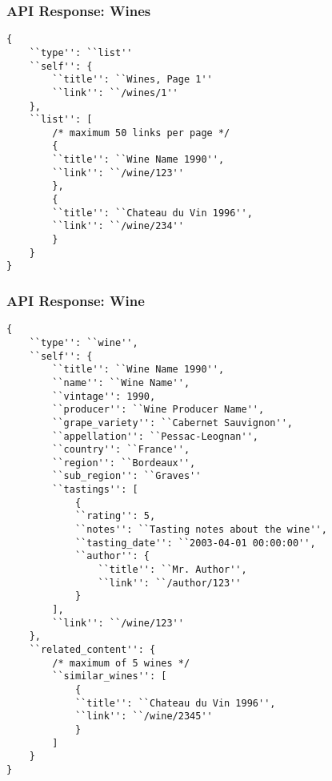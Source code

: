 \subsubsection{API Response: Wines}\label{app:apiwines}
\begin{verbatim}
{
    ``type'': ``list''
    ``self'': {
        ``title'': ``Wines, Page 1''
        ``link'': ``/wines/1''
    },
    ``list'': [
        /* maximum 50 links per page */
        {
        ``title'': ``Wine Name 1990'',
        ``link'': ``/wine/123''
        },
        {
        ``title'': ``Chateau du Vin 1996'',
        ``link'': ``/wine/234''
        }
    }
}
\end{verbatim}

\subsubsection{API Response: Wine}\label{app:apiwine}

\begin{verbatim}
{
    ``type'': ``wine'',
    ``self'': {
        ``title'': ``Wine Name 1990'',
        ``name'': ``Wine Name'',
        ``vintage'': 1990,
        ``producer'': ``Wine Producer Name'',
        ``grape_variety'': ``Cabernet Sauvignon'',
        ``appellation'': ``Pessac-Leognan'',
        ``country'': ``France'',
        ``region'': ``Bordeaux'',
        ``sub_region'': ``Graves''
        ``tastings'': [
            {
            ``rating'': 5,
            ``notes'': ``Tasting notes about the wine'',
            ``tasting_date'': ``2003-04-01 00:00:00'',
            ``author'': {
                ``title'': ``Mr. Author'',
                ``link'': ``/author/123''
            }
        ],
        ``link'': ``/wine/123''
    },
    ``related_content'': {
        /* maximum of 5 wines */
        ``similar_wines'': [
            {
            ``title'': ``Chateau du Vin 1996'',
            ``link'': ``/wine/2345''
            }
        ]
    }
}
\end{verbatim}

\normalsize
